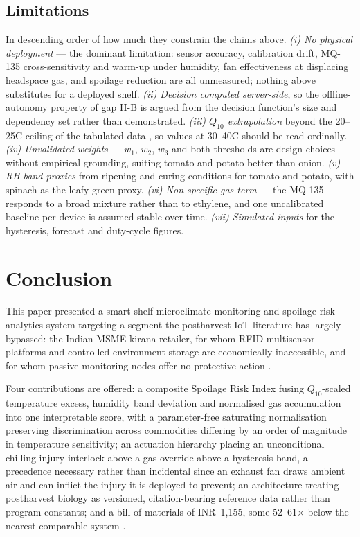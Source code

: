 \documentclass[conference]{IEEEtran}
\newcommand{\INR}{INR~}
\begin{document}
\subsection{Limitations}
\label{sec:limitations}

In descending order of how much they constrain the claims above.
\emph{(i) No physical deployment} --- the dominant limitation: sensor
accuracy, calibration drift, MQ-135 cross-sensitivity and warm-up under
humidity, fan effectiveness at displacing headspace gas, and spoilage
reduction are all unmeasured; nothing above substitutes for a deployed
shelf. \emph{(ii) Decision computed server-side}, so the offline-autonomy
property of gap II-B is argued from the decision function's size and
dependency set rather than demonstrated. \emph{(iii) $Q_{10}$
extrapolation} beyond the 20--25\textdegree C ceiling of the tabulated
data \cite{ah66}, so values at 30--40\textdegree C should be read
ordinally. \emph{(iv) Unvalidated
weights} --- $w_1$, $w_2$, $w_3$ and both thresholds are design choices
without empirical grounding, suiting tomato and potato better than onion.
\emph{(v) RH-band proxies} from ripening and curing conditions for tomato
and potato, with spinach as the leafy-green proxy. \emph{(vi)
Non-specific gas term} --- the MQ-135 responds to a broad mixture rather
than to ethylene, and one uncalibrated baseline per device is assumed
stable over time. \emph{(vii) Simulated inputs} for the hysteresis, forecast and duty-cycle
figures.

\section{Conclusion}
\label{sec:conclusion}

This paper presented a smart shelf microclimate monitoring and spoilage
risk analytics system targeting a segment the postharvest IoT literature
has largely bypassed: the Indian MSME kirana retailer, for whom RFID
multisensor platforms \cite{song2024rfid,cao2026,song2024sensors} and
controlled-environment storage \cite{kumar2026} are economically
inaccessible, and for whom passive monitoring nodes offer no protective
action \cite{samano2024,bhattacharjee2025}.

Four contributions are offered: a composite Spoilage Risk Index fusing
$Q_{10}$-scaled temperature excess, humidity band deviation and normalised
gas accumulation into one interpretable score, with a parameter-free
saturating normalisation preserving discrimination across commodities
differing by an order of magnitude in temperature sensitivity; an
actuation hierarchy placing an unconditional chilling-injury interlock
above a gas override above a hysteresis band, a precedence necessary
rather than incidental since an exhaust fan draws ambient air and can
inflict the injury it is deployed to prevent; an architecture treating
postharvest biology \cite{ah66} as versioned, citation-bearing reference
data rather than program constants; and a bill of materials of
\INR{}1{,}155, some 52--61$\times$ below the nearest comparable system
\cite{kumar2026}.
\end{document}
